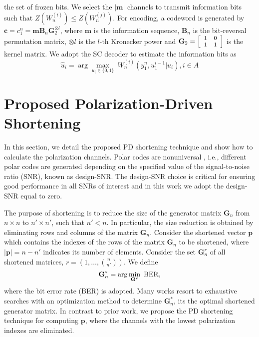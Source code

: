 \documentclass[10pt,twocolumn]{IEEEtran}
\begin{document}
the set of frozen bits. We select the $|\textbf{m}|$ channels to
transmit information bits such that $Z(W_n^{(i)}) \leq
Z(W_n^{(j)})$. For encoding, a codeword is generated by
$\textbf{c}=c^n_1=\textbf{m}\textbf{B}_n\textbf{G}^{\otimes l}_2$,
where $\textbf{m}$ is the information sequence, $\textbf{B}_n$ is
the bit-reversal permutation matrix, $\otimes l$ is the $l$-th
Kronecker power and $\textbf{G}_2 =
\footnotesize\left[\begin{array}{cc}
1 & 0 \\
1 & 1 \end{array} \right]$ is the kernel matrix. We adopt the SC
decoder to estimate the information bits as \cite{Arikan}
\begin{equation}
\hat{u}_i=\arg\max\limits_{u_i \in \{0,1\}} \ W_n^{(i)}(y_1^n,u_1^{i-1}|u_i),i \in A
\end{equation}

\section{Proposed Polarization-Driven Shortening}

In this section, we detail the proposed PD shortening technique and
show how to calculate the polarization channels. Polar codes are
nonuniversal \cite{Arikan}, i.e., different polar codes are
generated depending on the specified value of the signal-to-noise
ratio (SNR), known as design-SNR. The design-SNR choice is critical
for ensuring good performance in all SNRs of interest and in this
work we adopt the design-SNR equal to zero.

The purpose of shortening is to reduce the size of the generator
matrix $\textbf{G}_n$ from $n \times n$ to $n' \times n'$, such that
$n' < n$. In particular, the size reduction is obtained by
eliminating rows and columns of the matrix $\textbf{G}_n$. Consider
the shortened vector $\textbf{p}$ which contains the indexes of the
rows of the matrix $\textbf{G}_n$ to be shortened, where
$|\textbf{p}|=n-n'$ indicates its number of elements. Consider the
set $\textbf{G}_n^r$ of all shortened matrices,
$r=(1,\ldots,\binom{n}{n'})$. We define
\begin{equation}
\textbf{G}_n^*=\arg \min\limits_{\textbf{G}^r} \ \rm BER,
\end{equation}
where the bit error rate (BER) is adopted. Many works resort to
exhaustive searches with an optimization method to determine
$\textbf{G}_n^*$, its the optimal shortened generator matrix. In
contrast to prior work, we propose the PD shortening technique for
computing $\textbf{p}$, where the channels with the lowest
polarization indexes are eliminated.
\end{document}
